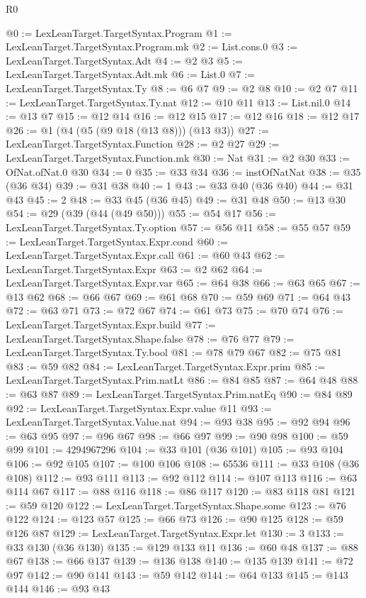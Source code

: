 \begin{lexlean}{R0}
\begin{coremodule}
@0 := LexLeanTarget.TargetSyntax.Program
@1 := LexLeanTarget.TargetSyntax.Program.mk
@2 := List.cons.{0}
@3 := LexLeanTarget.TargetSyntax.Adt
@4 := @2 @3
@5 := LexLeanTarget.TargetSyntax.Adt.mk
@6 := List.{0}
@7 := LexLeanTarget.TargetSyntax.Ty
@8 := @6 @7
@9 := @2 @8
@10 := @2 @7
@11 := LexLeanTarget.TargetSyntax.Ty.nat
@12 := @10 @11
@13 := List.nil.{0}
@14 := @13 @7
@15 := @12 @14
@16 := @12 @15
@17 := @12 @16
@18 := @12 @17
@26 := @1 (@4 (@5 (@9 @18 (@13 @8))) (@13 @3))
@27 := LexLeanTarget.TargetSyntax.Function
@28 := @2 @27
@29 := LexLeanTarget.TargetSyntax.Function.mk
@30 := Nat
@31 := @2 @30
@33 := OfNat.ofNat.{0} @30
@34 := 0
@35 := @33 @34
@36 := instOfNatNat
@38 := @35 (@36 @34)
@39 := @31 @38
@40 := 1
@43 := @33 @40 (@36 @40)
@44 := @31 @43
@45 := 2
@48 := @33 @45 (@36 @45)
@49 := @31 @48
@50 := @13 @30
@54 := @29 (@39 (@44 (@49 @50)))
@55 := @54 @17
@56 := LexLeanTarget.TargetSyntax.Ty.option
@57 := @56 @11
@58 := @55 @57
@59 := LexLeanTarget.TargetSyntax.Expr.cond
@60 := LexLeanTarget.TargetSyntax.Expr.call
@61 := @60 @43
@62 := LexLeanTarget.TargetSyntax.Expr
@63 := @2 @62
@64 := LexLeanTarget.TargetSyntax.Expr.var
@65 := @64 @38
@66 := @63 @65
@67 := @13 @62
@68 := @66 @67
@69 := @61 @68
@70 := @59 @69
@71 := @64 @43
@72 := @63 @71
@73 := @72 @67
@74 := @61 @73
@75 := @70 @74
@76 := LexLeanTarget.TargetSyntax.Expr.build
@77 := LexLeanTarget.TargetSyntax.Shape.false
@78 := @76 @77
@79 := LexLeanTarget.TargetSyntax.Ty.bool
@81 := @78 @79 @67
@82 := @75 @81
@83 := @59 @82
@84 := LexLeanTarget.TargetSyntax.Expr.prim
@85 := LexLeanTarget.TargetSyntax.Prim.natLt
@86 := @84 @85
@87 := @64 @48
@88 := @63 @87
@89 := LexLeanTarget.TargetSyntax.Prim.natEq
@90 := @84 @89
@92 := LexLeanTarget.TargetSyntax.Expr.value @11
@93 := LexLeanTarget.TargetSyntax.Value.nat
@94 := @93 @38
@95 := @92 @94
@96 := @63 @95
@97 := @96 @67
@98 := @66 @97
@99 := @90 @98
@100 := @59 @99
@101 := 4294967296
@104 := @33 @101 (@36 @101)
@105 := @93 @104
@106 := @92 @105
@107 := @100 @106
@108 := 65536
@111 := @33 @108 (@36 @108)
@112 := @93 @111
@113 := @92 @112
@114 := @107 @113
@116 := @63 @114 @67
@117 := @88 @116
@118 := @86 @117
@120 := @83 @118 @81
@121 := @59 @120
@122 := LexLeanTarget.TargetSyntax.Shape.some
@123 := @76 @122
@124 := @123 @57
@125 := @66 @73
@126 := @90 @125
@128 := @59 @126 @87
@129 := LexLeanTarget.TargetSyntax.Expr.let
@130 := 3
@133 := @33 @130 (@36 @130)
@135 := @129 @133 @11
@136 := @60 @48
@137 := @88 @67
@138 := @66 @137
@139 := @136 @138
@140 := @135 @139
@141 := @72 @97
@142 := @90 @141
@143 := @59 @142
@144 := @64 @133
@145 := @143 @144
@146 := @93 @43

\end{coremodule}
\end{lexlean}
